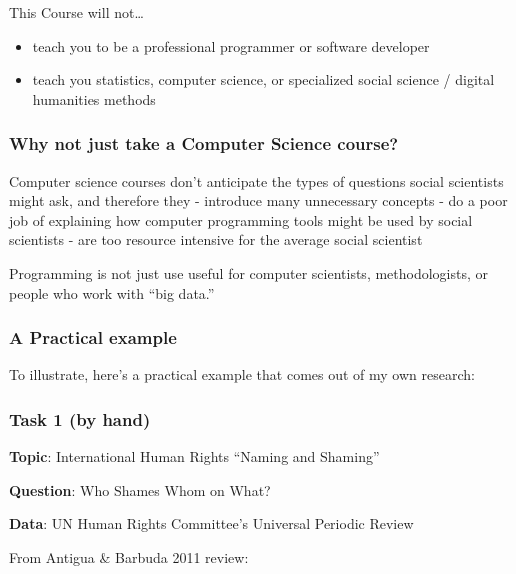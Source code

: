 \documentclass[]{book}
\providecommand{\tightlist}{%
  \setlength{\itemsep}{0pt}\setlength{\parskip}{0pt}}
\begin{document}
This Course will not\ldots{}

\begin{itemize}
\tightlist
\item
  teach you to be a professional programmer or software developer
\item
  teach you statistics, computer science, or specialized social science / digital humanities methods
\end{itemize}

\hypertarget{why-not-just-take-a-computer-science-course}{%
\subsubsection*{Why not just take a Computer Science course?}\label{why-not-just-take-a-computer-science-course}}

Computer science courses don't anticipate the types of questions social scientists might ask, and therefore they
- introduce many unnecessary concepts
- do a poor job of explaining how computer programming tools might be used by social scientists
- are too resource intensive for the average social scientist

Programming is not just use useful for computer scientists, methodologists, or people who work with ``big data.''

\hypertarget{a-practical-example}{%
\subsubsection*{A Practical example}\label{a-practical-example}}

To illustrate, here's a practical example that comes out of my own research:

\hypertarget{task-1-by-hand}{%
\subsubsection*{Task 1 (by hand)}\label{task-1-by-hand}}

\textbf{Topic}: International Human Rights ``Naming and Shaming''

\textbf{Question}: Who Shames Whom on What?

\textbf{Data}: UN Human Rights Committee's Universal Periodic Review

From Antigua \& Barbuda 2011 review:
\end{document}

